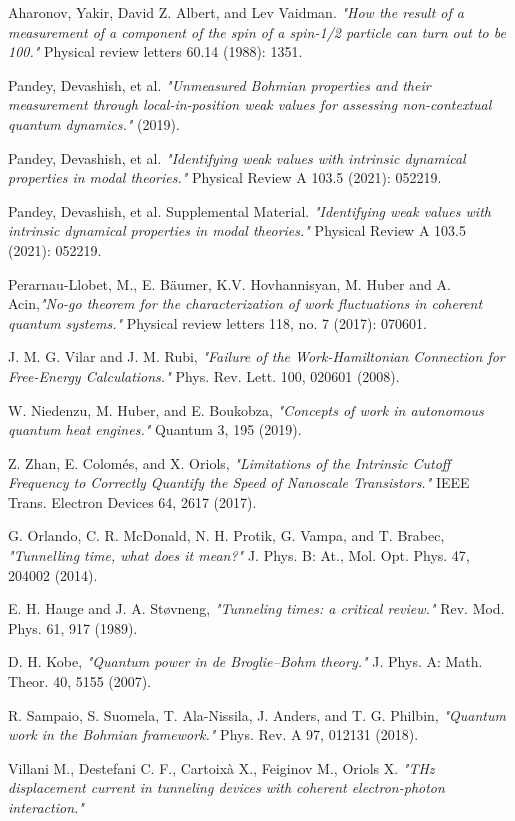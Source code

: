 \documentclass[11pt, a4paper]{article} %
\begin{document}
\begin{thebibliography}{1}
{
Aharonov, Yakir, David Z. Albert, and Lev Vaidman. {\em "How the result of a measurement of a component of the spin of a spin-1/2 particle can turn out to be 100."} Physical review letters 60.14 (1988): 1351.

Pandey, Devashish, et al. {\em "Unmeasured Bohmian properties and their measurement through local-in-position weak values for assessing non-contextual quantum dynamics."} (2019).

Pandey, Devashish, et al. {\em "Identifying weak values with intrinsic dynamical properties in modal theories."} Physical Review A 103.5 (2021): 052219.

Pandey, Devashish, et al. Supplemental Material. {\em "Identifying weak values with intrinsic dynamical properties in modal theories."} Physical Review A 103.5 (2021): 052219.

Perarnau-Llobet, M., E. Bäumer, K.V. Hovhannisyan, M. Huber and A. Acin,{\em "No-go theorem for the characterization of work fluctuations in coherent quantum systems."} Physical review letters 118, no. 7 (2017): 070601.

J. M. G. Vilar and J. M. Rubi, {\em "Failure of the Work-Hamiltonian Connection for Free-Energy Calculations." }Phys. Rev. Lett. 100, 020601 (2008).

W. Niedenzu, M. Huber, and E. Boukobza, {\em "Concepts of work in autonomous quantum heat engines."} Quantum 3, 195 (2019).

Z. Zhan, E. Colomés, and X. Oriols, {\em  "Limitations of the Intrinsic Cutoff Frequency to Correctly Quantify the Speed of Nanoscale Transistors."} IEEE Trans. Electron Devices 64, 2617 (2017).

G. Orlando, C. R. McDonald, N. H. Protik, G. Vampa, and T. Brabec, {\em "Tunnelling time, what does it mean?"} J. Phys. B: At., Mol. Opt. Phys. 47, 204002 (2014).

E. H. Hauge and J. A. Støvneng, {\em "Tunneling times: a critical review."} Rev. Mod. Phys. 61, 917 (1989).

D. H. Kobe, {\em "Quantum power in de Broglie–Bohm theory."} J. Phys. A: Math. Theor. 40, 5155 (2007).

R. Sampaio, S. Suomela, T. Ala-Nissila, J. Anders, and T. G. Philbin, {\em "Quantum work in the Bohmian framework."} Phys. Rev. A 97, 012131 (2018).

Villani M., Destefani C. F., Cartoixà X., Feiginov M., Oriols X. {\em "THz displacement current in tunneling devices with coherent electron-photon
interaction."}

}

\end{thebibliography}
\end{document}

